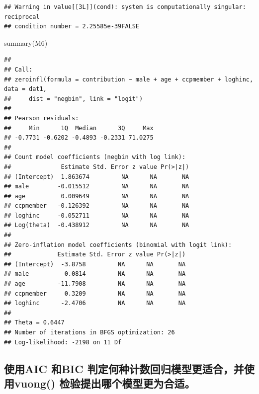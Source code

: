 \documentclass[
]{ctexart}
\newenvironment{Shaded}{\begin{snugshade}}{\end{snugshade}}
\newcommand{\FunctionTok}[1]{\textcolor[rgb]{0.00,0.00,0.00}{#1}}
\newcommand{\NormalTok}[1]{#1}
\begin{document}
\begin{verbatim}
## Warning in value[[3L]](cond): system is computationally singular: reciprocal
## condition number = 2.25585e-39FALSE
\end{verbatim}

\begin{Shaded}
\begin{Highlighting}[]
\FunctionTok{summary}\NormalTok{(M6)}
\end{Highlighting}
\end{Shaded}

\begin{verbatim}
## 
## Call:
## zeroinfl(formula = contribution ~ male + age + ccpmember + loghinc, data = dat1, 
##     dist = "negbin", link = "logit")
## 
## Pearson residuals:
##     Min      1Q  Median      3Q     Max 
## -0.7731 -0.6202 -0.4893 -0.2331 71.0275 
## 
## Count model coefficients (negbin with log link):
##              Estimate Std. Error z value Pr(>|z|)
## (Intercept)  1.863674         NA      NA       NA
## male        -0.015512         NA      NA       NA
## age          0.009649         NA      NA       NA
## ccpmember   -0.126392         NA      NA       NA
## loghinc     -0.052711         NA      NA       NA
## Log(theta)  -0.438912         NA      NA       NA
## 
## Zero-inflation model coefficients (binomial with logit link):
##             Estimate Std. Error z value Pr(>|z|)
## (Intercept)  -3.8758         NA      NA       NA
## male          0.0814         NA      NA       NA
## age         -11.7908         NA      NA       NA
## ccpmember     0.3209         NA      NA       NA
## loghinc      -2.4706         NA      NA       NA
## 
## Theta = 0.6447 
## Number of iterations in BFGS optimization: 26 
## Log-likelihood: -2198 on 11 Df
\end{verbatim}

\hypertarget{ux4f7fux7528aic-ux548cbic-ux5224ux5b9aux4f55ux79cdux8ba1ux6570ux56deux5f52ux6a21ux578bux66f4ux9002ux5408ux5e76ux4f7fux7528vuong-ux68c0ux9a8cux63d0ux51faux54eaux4e2aux6a21ux578bux66f4ux4e3aux5408ux9002}{%
\subsection{使用AIC 和BIC 判定何种计数回归模型更适合，并使用vuong()
检验提出哪个模型更为合适。}\label{ux4f7fux7528aic-ux548cbic-ux5224ux5b9aux4f55ux79cdux8ba1ux6570ux56deux5f52ux6a21ux578bux66f4ux9002ux5408ux5e76ux4f7fux7528vuong-ux68c0ux9a8cux63d0ux51faux54eaux4e2aux6a21ux578bux66f4ux4e3aux5408ux9002}}
\end{document}
